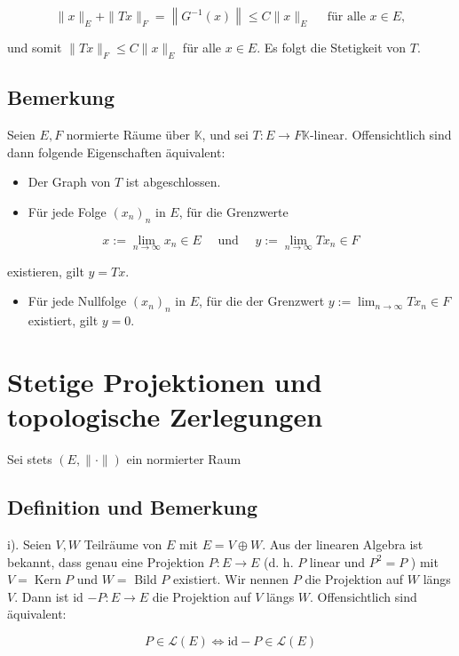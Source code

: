 \documentclass[10pt, letterpaper]{article}
\begin{document}
$$
\|x\|_{E}+\|T x\|_{F}=\left\|G^{-1}(x)\right\| \leq C\|x\|_{E} \quad \text { für alle } x \in E,
$$

und somit $\|T x\|_{F} \leq C\|x\|_{E}$ für alle $x \in E$. Es folgt die Stetigkeit von $T$.

\subsection*{Bemerkung}
Seien $E, F$ normierte Räume über $\mathbb{K}$, und sei $T: E \rightarrow F \mathbb{K}$-linear. Offensichtlich sind dann folgende Eigenschaften äquivalent:

\begin{itemize}
  \item Der Graph von $T$ ist abgeschlossen.
  \item Für jede Folge $\left(x_{n}\right)_{n}$ in $E$, für die Grenzwerte
\end{itemize}

$$
x:=\lim _{n \rightarrow \infty} x_{n} \in E \quad \text { und } \quad y:=\lim _{n \rightarrow \infty} T x_{n} \in F
$$

existieren, gilt $y=T x$.

\begin{itemize}
  \item Für jede Nullfolge $\left(x_{n}\right)_{n}$ in $E$, für die der Grenzwert $y:=\lim _{n \rightarrow \infty} T x_{n} \in F$ existiert, gilt $y=0$.
\end{itemize}

\section*{Stetige Projektionen und topologische Zerlegungen}
Sei stets $(E,\|\cdot\|)$ ein normierter Raum

\subsection*{Definition und Bemerkung}
i). Seien $V, W$ Teilräume von $E$ mit $E=V \oplus W$. Aus der linearen Algebra ist bekannt, dass genau eine Projektion $P: E \rightarrow E$ (d. h. $P$ linear und $P^{2}=P$ ) mit $V=\operatorname{Kern} P$ und $W=$ Bild $P$ existiert. Wir nennen $P$ die Projektion auf $W$ längs $V$. Dann ist id $-P: E \rightarrow E$ die Projektion auf $V$ längs $W$. Offensichtlich sind äquivalent:

$$
P \in \mathcal{L}(E) \Longleftrightarrow \mathrm{id}-P \in \mathcal{L}(E)
$$
\end{document}
